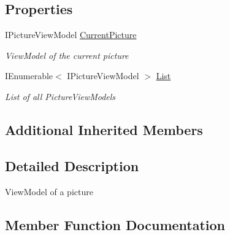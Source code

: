 \subsection*{Properties}
\begin{DoxyCompactItemize}
\item 
I\+Picture\+View\+Model \mbox{\hyperlink{class_pic_d_b_1_1_view_models_1_1_picture_list_view_model_a0be4d92bdc6df25c70d3381d9858b184}{Current\+Picture}}
\begin{DoxyCompactList}\small\item\em View\+Model of the current picture \end{DoxyCompactList}\item 
I\+Enumerable$<$ I\+Picture\+View\+Model $>$ \mbox{\hyperlink{class_pic_d_b_1_1_view_models_1_1_picture_list_view_model_a8889f6d5333a8d44a273776d92bba1b0}{List}}
\begin{DoxyCompactList}\small\item\em List of all Picture\+View\+Models \end{DoxyCompactList}\end{DoxyCompactItemize}
\subsection*{Additional Inherited Members}


\subsection{Detailed Description}
View\+Model of a picture 



\subsection{Member Function Documentation}
\mbox{\label{class_pic_d_b_1_1_view_models_1_1_picture_list_view_model_a5225ed542833b5ce034f5ed1a19389af}} 
